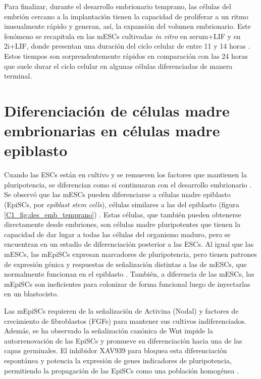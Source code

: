\documentclass[./main.tex]{subfiles}
\begin{document}
Para finalizar, durante el desarrollo embrionario temprano, las células del embrión cercano a la implantación tienen la capacidad de proliferar a un ritmo inusualmente rápido y generan, así, la expansión del volumen embrionario. Este fenómeno se recapitula en las mESCs cultivadas \textit{in vitro} en serum+LIF y en 2i+LIF, donde presentan una duración del ciclo celular de entre 11 y 14 horas \cite{Waisman2019,Snow1977}. Estos tiempos son sorprendentemente rápidos en comparación con las 24 horas que suele durar el ciclo celular en algunas células diferenciadas de manera terminal. 



\section{Diferenciación de células madre embrionarias en células madre epiblasto}
\label{C1_sec:EpiSCs}
Cuando las ESCs están en cultivo y se remueven los factores que mantienen la pluripotencia, se diferencian como si continuaran con el desarrollo embrionario \cite{Keller1995,Keller2005}. Se observó que las mESCs pueden diferenciarse a células madre epiblasto (EpiSCs, por \textit{epiblast stem cells}), células similares a las del epiblasto (figura \ref{C1_fig:des_emb_temprano}) \cite{Kojima2014,Brons2007}. Estas células, que también pueden obtenerse directamente desde embriones, son células madre pluripotentes que tienen la capacidad de dar lugar a todas las células del organismo maduro, pero se encuentran en un estadío de diferenciación posterior a las ESCs. Al igual que las mESCs, las mEpiSCs expresan marcadores de pluripotencia, pero tienen patrones de expresión génica y respuestas de señalización distintas a las de mESCs, que normalmente funcionan en el epiblasto \cite{Tesar2007}. También, a diferencia de las mESCs, las mEpiSCs son ineficientes para colonizar de forma funcional luego de inyectarlas en un blastocisto.




Las mEpiSCs requieren de la señalización de Activina (Nodal) y factores de crecimiento de fibroblastos (FGFs) para mantener sus cultivos indiferenciados. Además, se ha observado la señalización canónica de Wnt impide la autorrenovación de las EpiSCs y promueve su diferenciación hacia una de las capas germinales. El inhibidor XAV939 para bloquea esta diferenciación espontánea y potencia la expresión de genes indicadores de pluripotencia, permitiendo la propagación de las EpiSCs como una población homogénea \cite{Guo2009,Tsukiyama2014,Brons2007,Sumi2013,Ying2003,Weinberger2016}. 
\end{document}
